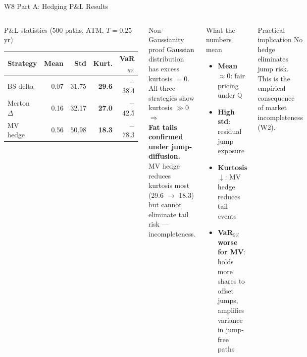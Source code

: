 \documentclass[aspectratio=169,10pt]{beamer}
\begin{document}
\begin{frame}{W8 Part A: Hedging P\&L Results}
\begin{columns}[T]
\begin{block}{P\&L statistics (500 paths, ATM, $T=0.25$\,yr)}
\footnotesize
\begin{tabular}{lrrrr}
\toprule
Strategy & Mean & Std & Kurt. & VaR$_{5\%}$ \\
\midrule
BS delta    & 0.07 & 31.75 & \textbf{29.6} & $-$38.4 \\
Merton $\Delta$ & 0.16 & 32.17 & \textbf{27.0} & $-$42.5 \\
MV hedge    & 0.56 & 50.98 & \textbf{18.3} & $-$78.3 \\
\bottomrule
\end{tabular}
\end{block}

\begin{block}{Non-Gaussianity proof}
\footnotesize
Gaussian distribution has excess kurtosis $= 0$.\\
All three strategies show kurtosis $\gg 0$ $\Rightarrow$\\
\textbf{Fat tails confirmed under jump-diffusion.}\\[3pt]
MV hedge reduces kurtosis most (29.6 $\to$ 18.3)\\
but cannot eliminate tail risk — incompleteness.
\end{block}

\begin{block}{What the numbers mean}
\footnotesize
\begin{itemize}\itemsep4pt
  \item \textbf{Mean $\approx 0$}: fair pricing under $\mathbb{Q}$
  \item \textbf{High std}: residual jump exposure
  \item \textbf{Kurtosis $\downarrow$}: MV hedge reduces tail events
  \item \textbf{VaR$_{5\%}$ worse for MV}: holds more shares to offset jumps, amplifies variance in jump-free paths
\end{itemize}
\end{block}

\begin{alertblock}{Practical implication}
\footnotesize No hedge eliminates jump risk.\\
This is the empirical consequence\\
of market incompleteness (W2).
\end{alertblock}
\end{columns}
\end{frame}
\end{document}
